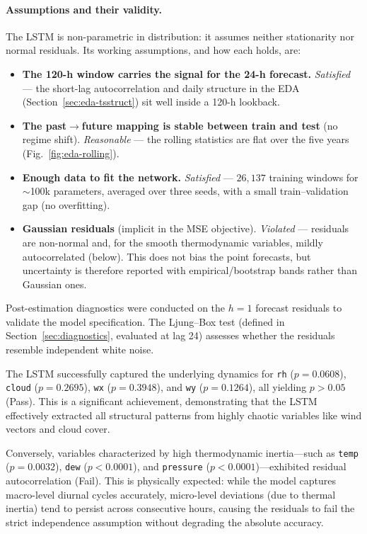 \documentclass[12pt,a4paper,oneside]{report}
\begin{document}
\paragraph{Assumptions and their validity.}
The LSTM is non-parametric in distribution: it assumes neither stationarity nor
normal residuals. Its working assumptions, and how each holds, are:
\begin{itemize}
  \item \textbf{The 120-h window carries the signal for the 24-h forecast.}
        \emph{Satisfied} --- the short-lag autocorrelation and daily structure in the
        EDA (Section~\ref{sec:eda-tsstruct}) sit well inside a 120-h lookback.
  \item \textbf{The past$\to$future mapping is stable between train and test}
        (no regime shift). \emph{Reasonable} --- the rolling statistics are flat over
        the five years (Fig.~\ref{fig:eda-rolling}).
  \item \textbf{Enough data to fit the network.} \emph{Satisfied} --- $26{,}137$
        training windows for $\sim$100k parameters, averaged over three seeds, with a
        small train--validation gap (no overfitting).
  \item \textbf{Gaussian residuals} (implicit in the MSE objective). \emph{Violated}
        --- residuals are non-normal and, for the smooth thermodynamic variables, mildly
        autocorrelated (below). This does not bias the point forecasts, but uncertainty
        is therefore reported with empirical/bootstrap bands rather than Gaussian ones.
\end{itemize}
Post-estimation diagnostics were conducted on the $h=1$ forecast residuals to validate the model specification. The Ljung--Box test (defined in Section~\ref{sec:diagnostics}, evaluated at lag 24) assesses whether the residuals resemble independent white noise.

The LSTM successfully captured the underlying dynamics for \texttt{rh} ($p=0.0608$), \texttt{cloud} ($p=0.2695$), \texttt{wx} ($p=0.3948$), and \texttt{wy} ($p=0.1264$), all yielding $p > 0.05$ (Pass). This is a significant achievement, demonstrating that the LSTM effectively extracted all structural patterns from highly chaotic variables like wind vectors and cloud cover. 

Conversely, variables characterized by high thermodynamic inertia—such as \texttt{temp} ($p=0.0032$), \texttt{dew} ($p < 0.0001$), and \texttt{pressure} ($p < 0.0001$)—exhibited residual autocorrelation (Fail). This is physically expected: while the model captures macro-level diurnal cycles accurately, micro-level deviations (due to thermal inertia) tend to persist across consecutive hours, causing the residuals to fail the strict independence assumption without degrading the absolute accuracy.
\end{document}
